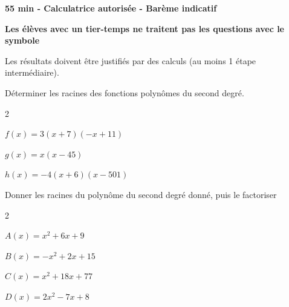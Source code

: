 \documentclass[12pt,a4paper]{article}  %
\begin{document}
\begin{center}

\end{center}


\begin{center}\textbf{55 min - Calculatrice autorisée - Barème indicatif}\end{center}

\begin{center}\textbf{Les élèves avec un tier-temps ne traitent pas les questions avec  le symbole }\end{center}

\begin{center}
Les résultats doivent être justifiés par des calculs (au moins 1 étape intermédiaire).
\end{center}
\vspace{.05cm} 


Déterminer les racines des fonctions polynômes du second degré.
\begin{multicols}{2}
\begin{enumMet}
    \item {} $f(x)=3(x+7)(-x+11)$
    \item $g(x)=x(x-45)$
    \item $h(x)=-4(x+6)(x-501)$
\end{enumMet}
\end{multicols}

\vspace{-0.3cm}

Donner les racines du polynôme du second degré donné, puis le factoriser
\begin{multicols}{2}
\begin{enumMet}
    \item {} $A(x)=x^{2}+6 x+9$
    \item $B(x)=-x^{2}+2 x+15$
    \item $C(x)=x^{2}+18 x+77$
    \item $D(x)=2 x^{2}-7 x+8$
\end{enumMet}
\end{multicols}
\end{document}
